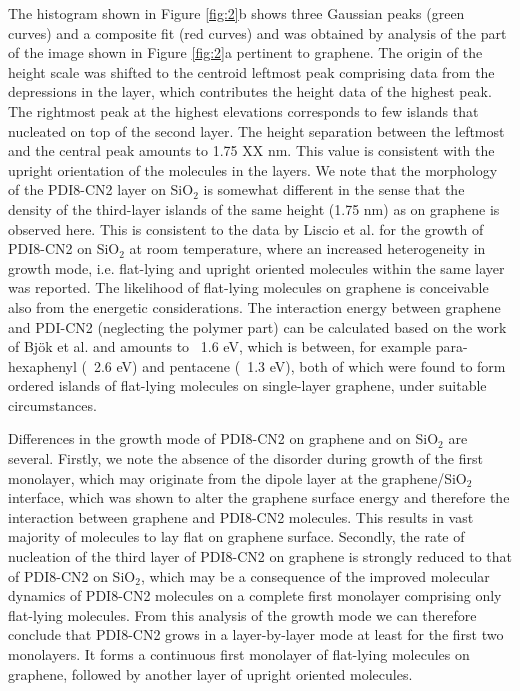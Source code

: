 \documentclass[preprint,aip,jap]{revtex4-2}
\begin{document}
The histogram shown in Figure \ref{fig:2}b shows three Gaussian peaks (green curves) and a composite fit (red curves) and was obtained by analysis of the part of the image shown in Figure \ref{fig:2}a pertinent to graphene. The origin of the height scale was shifted to the centroid leftmost peak comprising data from the depressions in the layer, which contributes the height data of the highest peak. The rightmost peak at the highest elevations corresponds to few islands that nucleated on top of the second layer. The height separation between the leftmost and the central peak amounts to 1.75 XX nm. This value is consistent with the upright orientation of the molecules in the layers. We note that the morphology of the PDI8-CN2 layer on SiO$_{2}$ is somewhat different in the sense that the density of the third-layer islands  of the same height (1.75 nm) as on graphene is observed here. This is consistent to the data by Liscio et al. for the growth of PDI8-CN2 on SiO$_{2}$ at room temperature, where an increased heterogeneity in growth mode, i.e. flat-lying and upright oriented molecules within the same layer was reported. The likelihood of flat-lying molecules on graphene is conceivable also from the energetic considerations. The interaction energy between graphene and PDI-CN2 (neglecting the polymer part) can be calculated based on the work of Bj\"{o}k et al.\cite{bjork-2010} and amounts to ~1.6 eV, which is between, for example para-hexaphenyl (~2.6 eV) and pentacene (~1.3 eV), both of which were found to form ordered islands of flat-lying molecules on single-layer graphene, under suitable circumstances\cite{kratzer-2016}.

Differences in the growth mode of PDI8-CN2 on graphene and on SiO$_{2}$ are several. Firstly, we note the absence of the disorder during growth of the first monolayer, which may originate from the dipole layer at the graphene/SiO$_{2}$ interface, which was shown to alter the graphene surface energy and therefore the interaction between graphene and PDI8-CN2 molecules\cite{sabio-2008}\cite{chhikara-2014}. This results in vast majority of molecules to lay flat on graphene surface.\cite{kratzer-2016}  Secondly, the rate of nucleation of the third layer of PDI8-CN2 on graphene is strongly reduced to that of PDI8-CN2 on SiO$_{2}$, which may be a consequence of the improved molecular dynamics of PDI8-CN2 molecules on a complete first monolayer comprising only flat-lying molecules.   From this analysis of the growth mode we can therefore conclude that PDI8-CN2 grows in a layer-by-layer mode at least for the first two monolayers. It forms a continuous first monolayer of flat-lying molecules on graphene, followed by another layer of upright oriented molecules. 
\end{document}
